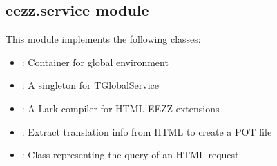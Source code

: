 \documentclass[letterpaper,10pt,english]{sphinxmanual}
\begin{document}

\begin{savenotes}\begin{fulllineitems}
\label{\detokenize{eezz:eezz.server.shutdown_function}}
\pysigstartsignatures
{}
\pysigstopsignatures
\end{fulllineitems}\end{savenotes}



\subsection{eezz.service module}
\label{\detokenize{eezz:module-eezz.service}}\label{\detokenize{eezz:eezz-service-module}}
\sphinxAtStartPar
This module implements the following classes:
\begin{itemize}
\item {} 
\sphinxAtStartPar
{}: Container for global environment

\item {} 
\sphinxAtStartPar
{}: A singleton for TGlobalService

\item {} 
\sphinxAtStartPar
{}: A Lark compiler for HTML EEZZ extensions

\item {} 
\sphinxAtStartPar
{}: Extract translation info from HTML to create a POT file

\item {} 
\sphinxAtStartPar
{}: Class representing the query of an HTML request

\end{itemize}
\end{document}
